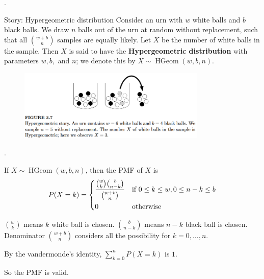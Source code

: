 \documentclass[8pt]{beamer}
\newcommand{\HGeom}[3]{\operatorname{HGeom}\!\left(#1, #2, #3\right)}
\begin{document}
\begin{frame}{.}
    \begin{block}{Story: Hypergeometric distribution}
        Consider an urn with $w$ white balls and $b$ black balls. We draw $n$ balls out of the urn at random without replacement, such that all $\binom{w+b}{n}$ samples are equally likely. Let $X$ be the number of white balls in the sample. Then $X$ is said to have the \textbf{Hypergeometric distribution} with parameters $w,b,$ and $n$; we denote this by $X \sim \HGeom{w}{b}{n}$.

    \end{block}

    \begin{figure}
        \includegraphics[width=0.8\textwidth]{HGeomFigure.png}
    \end{figure}
\end{frame}


\begin{frame}{.}
    \begin{theorem}
        If $X \sim \HGeom{w}{b}{n}$, then the PMF of $X$ is
        \[
            P(X=k) = \begin{dcases}
            \frac{\binom{w}{k} \binom{b}{n-k}}{\binom{w+b}{n}} & \text{if }  0\leq k \leq w, 0 \leq n-k \leq b \\
            0 & \text{otherwise}
            \end{dcases}
        \]
    \end{theorem}

    $\binom{w}{k}$ means $k$ white ball is chosen. $\binom{b}{n-k}$ means $n-k$ black ball is chosen.
    Denominator $\binom{w+b}{n}$ considers all the possibility for $k=0, \dots, n$.

    By the vandermonde's identity,  $\sum_{k=0}^n P(X=k)$ is $1$.

    So the PMF is valid.
\end{frame}
\end{document}
